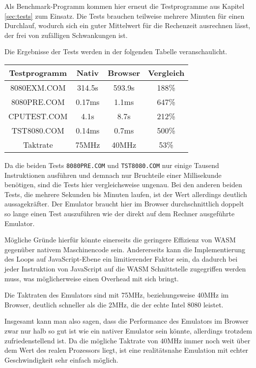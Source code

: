 Als Benchmark-Programm kommen hier erneut die Testprogramme aus Kapitel \ref{sec:tests} zum Einsatz. Die Tests brauchen teilweise mehrere Minuten für einen Durchlauf, wodurch sich ein guter Mittelwert für die Rechenzeit ausrechnen lässt, der frei von zufälligen Schwankungen ist.

Die Ergebnisse der Tests werden in der folgenden Tabelle veranschaulicht.

\begin{center}
\begin{tabular}{ |c|c|c|c| } 
    \hline
    Testprogramm & Nativ & Browser & Vergleich \\
    \hline
    8080EXM.COM & 314.5s & 593.9s & 188\% \\
    8080PRE.COM & 0.17ms & 1.1ms & 647\% \\
    CPUTEST.COM & 4.1s & 8.7s & 212\% \\
    TST8080.COM & 0.14ms & 0.7ms & 500\% \\
    \hline
    Taktrate & 75MHz & 40MHz & 53\% \\
    \hline
\end{tabular}
\end{center}

Da die beiden Tests \texttt{8080PRE.COM} und \texttt{TST8080.COM} nur einige Tausend Instruktionen ausführen und demnach nur Bruchteile einer Millisekunde benötigen, sind die Tests hier vergleichsweise ungenau. Bei den anderen beiden Tests, die mehrere Sekunden bis Minuten laufen, ist der Wert allerdings deutlich aussagekräfter. Der Emulator braucht hier im Browser durchschnittlich doppelt so lange einen Test auszuführen wie der direkt auf dem Rechner ausgeführte Emulator.

Mögliche Gründe hierfür könnte einerseits die geringere Effizienz von \ac{WASM} gegenüber nativem Maschinencode sein. Andererseits kann die Implementierung des Loops auf JavaScript-Ebene ein limitierender Faktor sein, da dadurch bei jeder Instruktion von JavaScript auf die \ac{WASM} Schnittstelle zugegriffen werden muss, was möglicherweise einen Overhead mit sich bringt.

Die Taktraten des Emulators sind mit 75MHz, beziehungsweise 40MHz im Browser, deutlich schneller als die 2MHz, die der echte Intel 8080 leistet.

Insgesamt kann man also sagen, dass die Performance des Emulators im Browser zwar nur halb so gut ist wie ein nativer Emulator sein könnte, allerdings trotzdem zufriedenstellend ist. Da die mögliche Taktrate von 40MHz immer noch weit über dem Wert des realen Prozessors liegt, ist eine realitätsnahe Emulation mit echter Geschwindigkeit sehr einfach möglich.